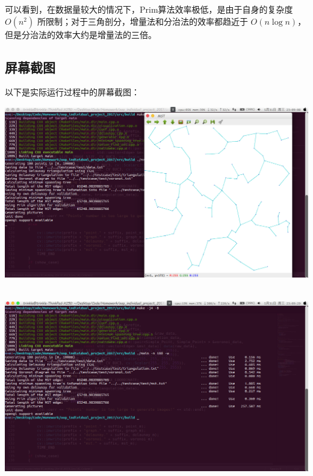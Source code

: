 \documentclass[a4paper]{article}
\begin{document}
可以看到，在数据量较大的情况下，Prim算法效率极低，是由于自身的复杂度 $O(n^2)$ 所限制；对于三角剖分，增量法和分治法的效率都趋近于 $O(n\log n)$，但是分治法的效率大约是增量法的三倍。

\subsection{屏幕截图}
以下是实际运行过程中的屏幕截图：
\begin{center}
\includegraphics[width=0.9\linewidth]{screen1.png}

~\\

\includegraphics[width=0.9\linewidth]{screen2.png}
\end{center}
\end{document}
